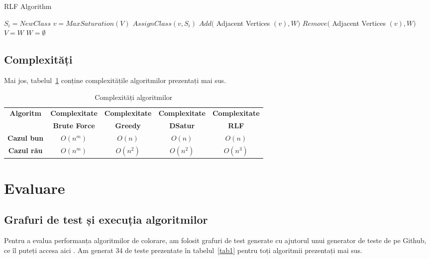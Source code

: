 \documentclass[runningheads]{llncs}
\begin{document}
\begin{algorithm}
\caption{RLF Algorithm}
\label{alg4}
\begin{algorithmic}[1]
\State $S_i = NewClass$
\State $v = MaxSaturation(V)$
\State $AssignClass(v, S_i)$
\State $Add($ Adjacent Vertices $(v), W)$
\State $Remove($ Adjacent Vertices $(v), W)$
\EndWhile
\State $V = W$
\State $W = \emptyset$
\EndWhile
\EndProcedure
\end{algorithmic}
\end{algorithm}

\subsection{Complexități}
Mai jos, tabelul~\ref{tabel_complexitate} conține complexitățile algoritmilor
prezentați mai sus.

\begin{table}[h]
\centering
\caption{Complexități algoritmilor}
\label{tabel_complexitate}
\begin{tabular}{|c|c|c|c|c|}
\hline

\textbf{Algoritm} & \textbf{Complexitate} & \textbf{Complexitate} & \textbf{Complexitate} & \textbf{Complexitate} \\
 & \textbf{Brute Force} & \textbf{Greedy} & \textbf{DSatur} & \textbf{RLF} \\
\hline
\hline
\textbf{Cazul bun} & $O(n^m)$ & $O(n)$ & $O(n)$ & $O(n)$ \\
\hline
\textbf{Cazul rău} & $O(n^m)$ & $O(n^2)$ & $O(n^2)$ & $O(n^3)$ \\
\hline
\end{tabular}
\end{table}

\section{Evaluare}
\subsection{Grafuri de test și execuția algoritmilor}
Pentru a evalua performanța algoritmilor de colorare, am folosit grafuri de test
generate cu ajutorul unui generator de teste de pe Github, ce îl puteți accesa aici \cite{16}.
Am generat 34 de teste prezentate în tabelul~\ref{tab1} pentru toți algoritmii
prezentați mai sus.
\end{document}
